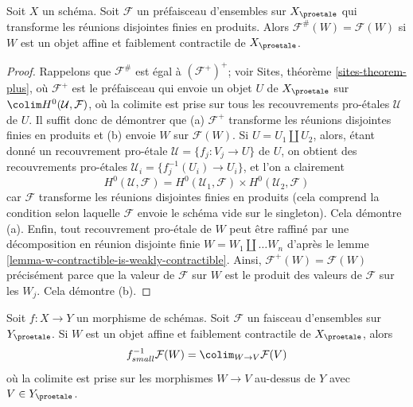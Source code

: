 \begin{lemma}
\label{lemma-presheaf-value-weakly-contractible}
Soit $X$ un schéma. Soit $\mathcal{F}$ un préfaisceau d'ensembles sur $X_\proetale$
qui transforme les réunions disjointes finies en produits. Alors
$\mathcal{F}^\#(W) = \mathcal{F}(W)$ si $W$ est un objet affine et faiblement contractile
de $X_\proetale$.
\end{lemma}

\begin{proof}
Rappelons que $\mathcal{F}^\#$ est égal à $(\mathcal{F}^+)^+$; voir
Sites, théorème \ref{sites-theorem-plus}, où $\mathcal{F}^+$
est le préfaisceau qui envoie un objet $U$ de $X_\proetale$ sur
$\colim H^0(\mathcal{U}, \mathcal{F})$, où la colimite est prise
sur tous les recouvrements pro-\'etales $\mathcal{U}$ de $U$.
Il suffit donc de démontrer que (a) $\mathcal{F}^+$ transforme les réunions
disjointes finies en produits et (b) envoie $W$ sur $\mathcal{F}(W)$.
Si $U = U_1 \amalg U_2$, alors, étant donné un recouvrement pro-\'etale
$\mathcal{U} = \{f_j : V_j \to U\}$ de $U$, on obtient des recouvrements pro-\'etales
$\mathcal{U}_i = \{f_j^{-1}(U_i) \to U_i\}$, et l'on a clairement
$$
H^0(\mathcal{U}, \mathcal{F}) =
H^0(\mathcal{U}_1, \mathcal{F}) \times
H^0(\mathcal{U}_2, \mathcal{F})
$$
car $\mathcal{F}$ transforme les réunions disjointes finies en produits (cela comprend
la condition selon laquelle $\mathcal{F}$ envoie le schéma vide sur le singleton).
Cela démontre (a).
Enfin, tout recouvrement pro-\'etale de $W$ peut être raffiné par une décomposition
en réunion disjointe finie $W = W_1 \amalg \ldots W_n$ d'après le
lemme \ref{lemma-w-contractible-is-weakly-contractible}.
Ainsi, $\mathcal{F}^+(W) = \mathcal{F}(W)$ précisément parce que la valeur de
$\mathcal{F}$ sur $W$ est le produit des valeurs de $\mathcal{F}$
sur les $W_j$. Cela démontre (b).
\end{proof}

\begin{lemma}
\label{lemma-small-pullback-weakly-contractible}
Soit $f : X \to Y$ un morphisme de schémas. Soit $\mathcal{F}$ un faisceau
d'ensembles sur $Y_\proetale$. Si $W$ est un objet affine et faiblement contractile
de $X_\proetale$, alors
$$
f_{small}^{-1}\mathcal{F}(W) = \colim_{W \to V} \mathcal{F}(V)
$$
où la colimite est prise sur les morphismes $W \to V$ au-dessus de $Y$
avec $V \in Y_\proetale$.
\end{lemma}

